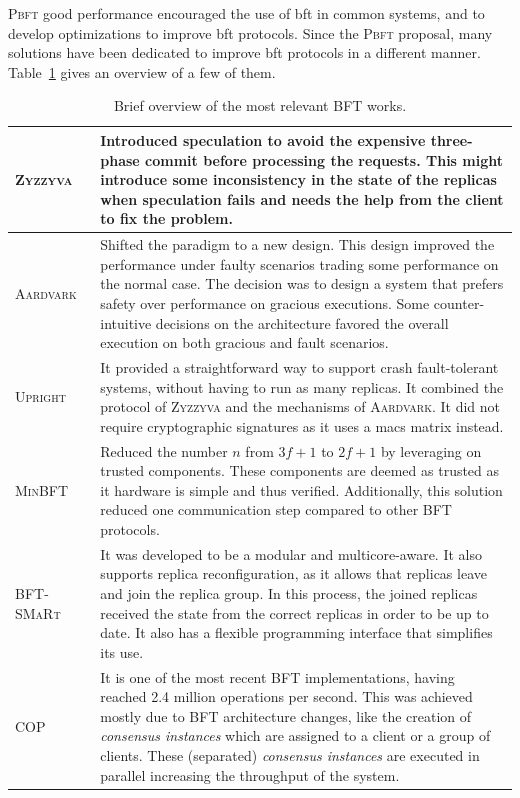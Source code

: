 \textsc{Pbft} good performance encouraged the use of \gls{bft} in common systems, and to develop optimizations to improve \gls{bft} protocols. 
Since the \textsc{Pbft} proposal, many solutions have been dedicated to improve \gls{bft} protocols in a different manner. 
Table~\ref{tab:bft} gives an overview of a few of them.


\begin{table}[h]
\begin{center}
{\footnotesize
\begin{tabular}{ p{2.5cm}  p{10.0cm}  }\hline
\textsc{Zyzzyva}~\cite{Kotla:2010}  & Introduced speculation to avoid the expensive three-phase commit before processing the requests. This might introduce some inconsistency in the state of the replicas when speculation fails and needs the help from the client to fix the problem. \\ \hline            
\textsc{Aardvark}~\cite{Clement:2009b} & Shifted the paradigm to a new design. This design improved the performance under faulty scenarios trading some performance on the normal case. The decision was to design a system that prefers safety over performance on gracious executions. Some counter-intuitive decisions on the architecture favored the overall execution on both gracious and fault scenarios. \\ \hline
\textsc{Upright}~\cite{Clement:2009} & It provided a straightforward way to support crash fault-tolerant systems, without having to run as many replicas. It combined the protocol of \textsc{Zyzzyva} and the mechanisms of \textsc{Aardvark}. It did not require cryptographic signatures as it uses a \glspl{mac} matrix instead. \\ \hline    
\textsc{MinBFT}~\cite{Veronese:2013}  & Reduced the number $n$ from $3f+1$ to $2f+1$ by leveraging on trusted components. These components are deemed as trusted as it hardware is simple and thus verified. Additionally, this solution reduced one communication step compared to other BFT protocols. \\ \hline
\textsc{BFT-SMaRt}~\cite{Bessani:2014} & It was developed to be a modular and multicore-aware. It also supports replica reconfiguration, as it allows that replicas leave and join the replica group. In this process, the joined replicas received the state from the correct replicas in order to be up to date. It also has a flexible programming interface that simplifies its use. \\ \hline
\textsc{COP}~\cite{Behl:2015} & It is one of the most recent BFT implementations, having reached 2.4 million operations per second. This was achieved mostly due to BFT architecture changes, like the creation of \emph{consensus instances} which are assigned to a client or a group of clients. These (separated) \emph{consensus instances} are executed in parallel increasing the throughput of the system.\\  \hline  
\end{tabular}
}
\caption{Brief overview of the most relevant BFT works.}

\label{tab:bft}
\end{center}
\end{table}




